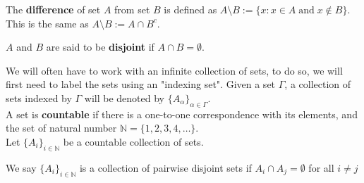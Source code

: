 \begin{defn}[Difference]
   The \textbf{difference} of set $A$ from set $B$ is defined as $A\setminus B:=\{ x: x\in A\; \text{and}\; x\notin B\}$.
   This is the same as $A\setminus B := A\cap B^c$. 
    \begin{center}
\end{center}
\end{defn}









\begin{defn}
$A$ and $B$ are said to be \textbf{disjoint} if $A\cap B=\emptyset$.
\end{defn}

We will often have to work with an infinite collection of sets, to do so, we will first need to label the sets using an "indexing set". Given a set $\Gamma$, a collection of sets indexed by $\Gamma$ will be denoted by $\{A_\alpha\}_{\alpha\in \Gamma}$. 
\\
A set is \textbf{countable} if there is a one-to-one correspondence with its elements, and the set of natural number $\mathbb{N}= \{1, 2, 3, 4, \dots\}$. 
\\

Let $\{A_i\}_{i\in\mathbb{N}}$ be a countable collection of sets. 

\begin{defn}
We say $\{A_i\}_{i\in\mathbb{N}}$ is a collection of pairwise disjoint sets if $A_i\cap A_j=\emptyset$ for all $i\neq j$
\end{defn}

